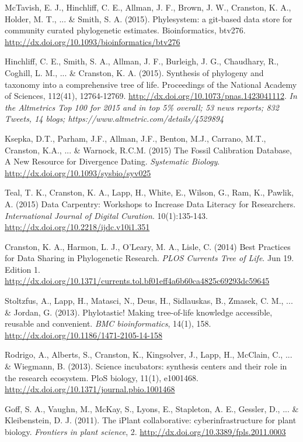 \documentclass[10pt]{article}
\begin{document}
McTavish, E. J., Hinchliff, C. E., Allman, J. F., Brown, J. W., Cranston, K. A., Holder, M. T., ... \& Smith, S. A. (2015). Phylesystem: a git-based data store for community curated phylogenetic estimates. Bioinformatics, btv276. \url{http://dx.doi.org/10.1093/bioinformatics/btv276} 

Hinchliff, C. E., Smith, S. A., Allman, J. F., Burleigh, J. G., Chaudhary, R., Coghill, L. M., ... \& Cranston, K. A. (2015). Synthesis of phylogeny and taxonomy into a comprehensive tree of life. Proceedings of the National Academy of Sciences, 112(41), 12764-12769. \url{http://dx.doi.org/10.1073/pnas.1423041112}. \textit{In the Altmetrics Top 100 for 2015 and in top 5\% overall; 53 news reports; 832 Tweets, 14 blogs; https://www.altmetric.com/details/4529894}

Ksepka, D.T., Parham, J.F., Allman, J.F., Benton, M.J., Carrano, M.T., Cranston, K.A., ... \& Warnock, R.C.M. (2015) The Fossil Calibration Database, A New Resource for Divergence Dating. \textit{Systematic Biology}. \url{http://dx.doi.org/10.1093/sysbio/syv025}

Teal, T. K., Cranston, K. A., Lapp, H., White, E., Wilson, G., Ram, K., Pawlik, A. (2015) Data Carpentry: Workshops to Increase Data Literacy for Researchers. \textit{International Journal of Digital Curation}. 10(1):135-143. \url{http://dx.doi.org/10.2218/ijdc.v10i1.351}
 
Cranston, K. A., Harmon, L. J., O'Leary, M. A., Lisle, C. (2014) Best Practices for Data Sharing in Phylogenetic Research. \textit{PLOS Currents Tree of Life}. Jun 19. Edition 1. \url{http://dx.doi.org/10.1371/currents.tol.bf01eff4a6b60ca4825c69293dc59645} 

Stoltzfus, A., Lapp, H., Matasci, N., Deus, H., Sidlauskas, B., Zmasek, C. M., ... \& Jordan, G. (2013). Phylotastic! Making tree-of-life knowledge accessible, reusable and convenient. \textit{BMC bioinformatics}, 14(1), 158. \url{http://dx.doi.org/10.1186/1471-2105-14-158} 

Rodrigo, A., Alberts, S., Cranston, K., Kingsolver, J., Lapp, H., McClain, C., ... \& Wiegmann, B. (2013). Science incubators: synthesis centers and their role in the research ecosystem. PloS biology, 11(1), e1001468. \url{http://dx.doi.org/10.1371/journal.pbio.1001468} 

Goff, S. A., Vaughn, M., McKay, S., Lyons, E., Stapleton, A. E., Gessler, D., ... \& Kleibenstein, D. J. (2011). The iPlant collaborative: cyberinfrastructure for plant biology. \textit{Frontiers in plant science}, 2. \url{http://dx.doi.org/10.3389/fpls.2011.0003} 
\end{document}
